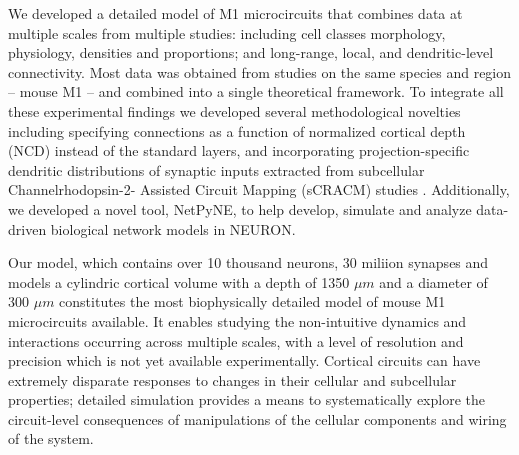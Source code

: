 
We developed a detailed model of M1 microcircuits that combines data at multiple scales from multiple studies: including cell classes morphology, physiology, densities and proportions; and long-range, local, and dendritic-level connectivity. Most data was obtained from studies on the same species and region -- mouse M1 --  and combined into a single theoretical framework. To integrate all these experimental findings we developed several methodological novelties including specifying connections as a function of normalized cortical depth (NCD) instead of the standard layers, and incorporating projection-specific dendritic distributions of synaptic inputs extracted from subcellular Channelrhodopsin-2- Assisted Circuit Mapping (sCRACM) studies \cite{Hook13,Sute15}. Additionally, we developed a novel tool, NetPyNE, to help develop, simulate and analyze data-driven biological network models in NEURON. 

Our model, which contains over 10 thousand neurons, 30 miliion synapses and models a cylindric cortical volume with a depth of 1350 $\mu m$ and a diameter of 300 $\mu m$ constitutes the most biophysically detailed model of mouse M1 microcircuits available. It enables studying the non-intuitive dynamics and interactions occurring across multiple scales, with a level of resolution and precision which is not yet available experimentally. Cortical circuits can have extremely disparate responses to changes in their cellular and subcellular properties; detailed simulation provides a means to systematically explore the circuit-level consequences of manipulations of the cellular components and wiring of the system.

